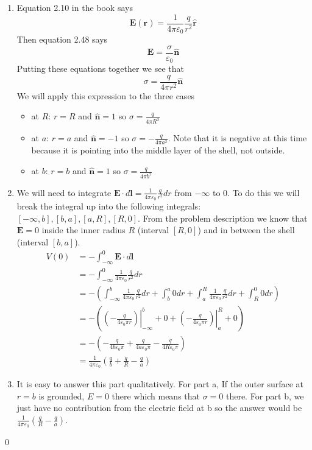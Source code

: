 \documentclass{homework}
\newcommand\ve{\varepsilon}
\newcommand{\bs}[1]{\ensuremath{\boldsymbol{#1}}}
\newcommand{\bhat}[1]{\ensuremath{\boldsymbol{\hat{#1}}}}
\newcommand{\intbounds}[3]{
   \ensuremath{
      \left. \left( #1 \right) \right|_{#2}^{#3}
   }
   }
\begin{document}
\begin{homeworkProblem}[Problem 2.38]
{    \begin{enumerate}
      \item Equation 2.10 in the book says $$\bs{E}(\bs{r}) = \frac{1}{4 \pi \ve_0} \frac{q}{r^2} \bhat{r} $$ Then equation 2.48 says $$\bs{E} = \frac{\sigma}{\ve_0} \bhat{n}$$ Putting these equations together we see that $$\sigma  = \frac{q}{4 \pi r^2} \bhat{n}$$ We will apply this expression to the three cases
        \begin{itemize}
          \item at $R$: $r = R$ and $\bhat{n}= 1$ so $\sigma = \frac{q}{4 \pi R^2} $
          \item at $a$: $r = a$ and $\bhat{n}= -1$ so $\sigma = - \frac{q}{4 \pi a^2} $. Note that it is negative at this time because it is pointing into the middle layer of the shell, not outside.
          \item at $b$: $r = b$ and $\bhat{n}= 1$ so $\sigma =  \frac{q}{4 \pi b^2} $
        \end{itemize}
    \item We will need to integrate $\bs{E} \cdot d \bs{l} = \frac{1}{4 \pi \ve_0} \frac{q}{r^2} dr$ from $-\infty$ to $0$. To do this we will break the integral up into the following integrals: $[-\infty, b], [b, a], [a, R] , [R, 0]$. From the problem description we know that $\bs{E} = 0$ inside the inner radius $R$ (interval $[R, 0]$) and in between the shell (interval $[b, a]$).
      \begin{align*}
        V(0) &= - \int_{-\infty}^0 \bs{E} \cdot d \bs{l} \\
          &= - \int_{-\infty}^0 \frac{1}{4 \pi \ve_0} \frac{q}{r^2} dr\\
          &= -\left( \int_{-\infty}^b  \frac{1}{4 \pi \ve_0} \frac{q}{r^2} dr + \int_b^a 0 dr+ \int_a^R  \frac{1}{4 \pi \ve_0} \frac{q}{r^2} dr+ \int_R^0 0 dr\right) \\
          &= - \left(\intbounds{- \frac{q}{4 \ve_0 \pi r}}{-\infty}{b}  + 0 + \intbounds{- \frac{q}{4 \ve_0 \pi r}}{a}{R} + 0\right)\\
          &= - \left(- \frac{q}{4 b \ve_0 \pi} + \frac{q}{4 a \ve_0 \pi} - \frac{q}{4 R \ve_0 \pi} \right) \\
          &= \frac{1}{4 \pi \ve_0} \left( \frac{q}{b} + \frac{q}{R} - \frac{q}{a}\right)
      \end{align*}
    \item It is easy to answer this part qualitatively. For part a, If the outer surface  at $r=b$ is grounded, $E=0$ there which means that $\sigma = 0 $ there. For part b, we just have no contribution from the electric field at b so the answer would be $\frac{1}{4 \pi \ve_0} \left(\frac{q}{R} - \frac{q}{a}\right)$.
    \end{enumerate}
    \qed
  }
\end{homeworkProblem}
\end{document}
